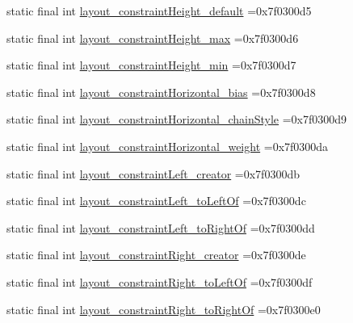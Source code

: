 \begin{DoxyCompactItemize}
static final int \mbox{\hyperlink{classbr_1_1unb_1_1cic_1_1mp_1_1marketmaster_1_1R_1_1attr_adead4c04ee7f7cdf18ecab5240367453}{layout\+\_\+constraint\+Height\+\_\+default}} =0x7f0300d5
\item 
static final int \mbox{\hyperlink{classbr_1_1unb_1_1cic_1_1mp_1_1marketmaster_1_1R_1_1attr_aad2a388e3152a9b756f28a509ab59528}{layout\+\_\+constraint\+Height\+\_\+max}} =0x7f0300d6
\item 
static final int \mbox{\hyperlink{classbr_1_1unb_1_1cic_1_1mp_1_1marketmaster_1_1R_1_1attr_a2a4f96169a0f3d94562c73da7953f3ce}{layout\+\_\+constraint\+Height\+\_\+min}} =0x7f0300d7
\item 
static final int \mbox{\hyperlink{classbr_1_1unb_1_1cic_1_1mp_1_1marketmaster_1_1R_1_1attr_a6ce12b24d3e36a69f930296f84e1a9b7}{layout\+\_\+constraint\+Horizontal\+\_\+bias}} =0x7f0300d8
\item 
static final int \mbox{\hyperlink{classbr_1_1unb_1_1cic_1_1mp_1_1marketmaster_1_1R_1_1attr_ad64d08315c638bb40f7f97062fe87481}{layout\+\_\+constraint\+Horizontal\+\_\+chain\+Style}} =0x7f0300d9
\item 
static final int \mbox{\hyperlink{classbr_1_1unb_1_1cic_1_1mp_1_1marketmaster_1_1R_1_1attr_a7c6a86a04f5a059369e5167d4c492644}{layout\+\_\+constraint\+Horizontal\+\_\+weight}} =0x7f0300da
\item 
static final int \mbox{\hyperlink{classbr_1_1unb_1_1cic_1_1mp_1_1marketmaster_1_1R_1_1attr_a0a86ff731d59a331a84d8a258e785ad5}{layout\+\_\+constraint\+Left\+\_\+creator}} =0x7f0300db
\item 
static final int \mbox{\hyperlink{classbr_1_1unb_1_1cic_1_1mp_1_1marketmaster_1_1R_1_1attr_ae3f03e195ba63d89b6ab740b3a1cd38b}{layout\+\_\+constraint\+Left\+\_\+to\+Left\+Of}} =0x7f0300dc
\item 
static final int \mbox{\hyperlink{classbr_1_1unb_1_1cic_1_1mp_1_1marketmaster_1_1R_1_1attr_aaf1116a5221a86e395c7361b797a157f}{layout\+\_\+constraint\+Left\+\_\+to\+Right\+Of}} =0x7f0300dd
\item 
static final int \mbox{\hyperlink{classbr_1_1unb_1_1cic_1_1mp_1_1marketmaster_1_1R_1_1attr_a892d5e75ff1a925239ea09e0775c5cf8}{layout\+\_\+constraint\+Right\+\_\+creator}} =0x7f0300de
\item 
static final int \mbox{\hyperlink{classbr_1_1unb_1_1cic_1_1mp_1_1marketmaster_1_1R_1_1attr_a1ded40ef82b446d32017b09d9bd5e0ed}{layout\+\_\+constraint\+Right\+\_\+to\+Left\+Of}} =0x7f0300df
\item 
static final int \mbox{\hyperlink{classbr_1_1unb_1_1cic_1_1mp_1_1marketmaster_1_1R_1_1attr_a3db7363d160d7a000b34427bf730bac9}{layout\+\_\+constraint\+Right\+\_\+to\+Right\+Of}} =0x7f0300e0

\end{DoxyCompactItemize}
